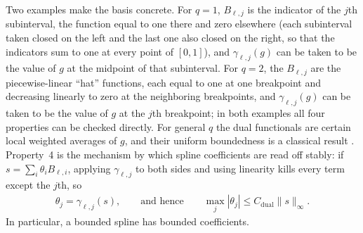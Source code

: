 Two examples make the basis concrete. For $q=1$, $B_{\ell,j}$ is the indicator of the $j$th subinterval, the function equal to one there and zero elsewhere (each subinterval taken closed on the left and the last one also closed on the right, so that the indicators sum to one at every point of $[0,1]$), and $\gamma_{\ell,j}(g)$ can be taken to be the value of $g$ at the midpoint of that subinterval. For $q=2$, the $B_{\ell,j}$ are the piecewise-linear ``hat'' functions, each equal to one at one breakpoint and decreasing linearly to zero at the neighboring breakpoints, and $\gamma_{\ell,j}(g)$ can be taken to be the value of $g$ at the $j$th breakpoint; in both examples all four properties can be checked directly. For general $q$ the dual functionals are certain local weighted averages of $g$, and their uniform boundedness is a classical result \citep[Theorem~4.41]{Schumaker2007}. Property~4 is the mechanism by which spline coefficients are read off stably: if $s=\sum_i\theta_iB_{\ell,i}$, applying $\gamma_{\ell,j}$ to both sides and using linearity kills every term except the $j$th, so
\begin{align}
\theta_j=\gamma_{\ell,j}(s),
\qquad\text{and hence}\qquad
\max_j|\theta_j|\leq C_{\mathrm{dual}}\|s\|_\infty.
\label{eq:dual-readout}
\end{align}
In particular, a bounded spline has bounded coefficients.

